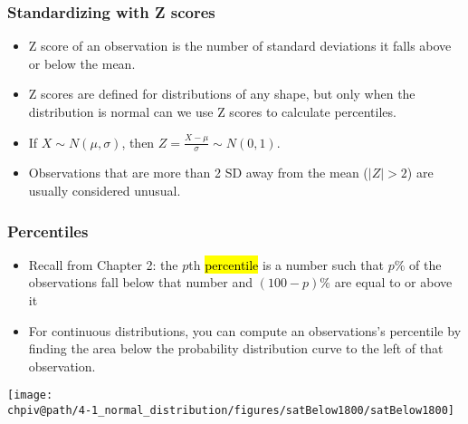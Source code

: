 \documentclass[slidestop,compress,mathserif]{beamer}
\makeatletter
\def\chpiv@path{../../Chp 4}
\makeatother
\begin{document}
\begin{frame}
\frametitle{Standardizing with Z scores}

\begin{itemize}

\item Z score of an observation is the number of standard deviations it falls above or below the mean.
\formula{\[Z = \frac{observation - mean}{SD}\]}
\pause

\item Z scores are defined for distributions of any shape, but only when the distribution is normal can we use Z scores to calculate percentiles.
\item If $X \sim N(\mu, \sigma)$, then $Z = \frac{X - \mu}{\sigma} \sim N(0, 1)$.

\pause
\item Observations that are more than 2 SD away from the mean ($|Z| > 2$) are usually considered unusual.

\end{itemize}

\end{frame}


\begin{frame}
\frametitle{Percentiles}

\begin{itemize}

\item Recall from Chapter 2: the $p$th \hl{percentile} is a number such that $p\%$ of the observations fall below that number and $(100 - p)\%$ are equal to or above it

\item For continuous distributions, you can compute an observations's percentile by finding the area below the probability distribution curve to the left of that observation.

\end{itemize}

\begin{center}
\texttt{[image: \\chpiv@path/4-1\_normal\_distribution/figures/satBelow1800/satBelow1800]}
\end{center}

\end{frame}
\end{document}
